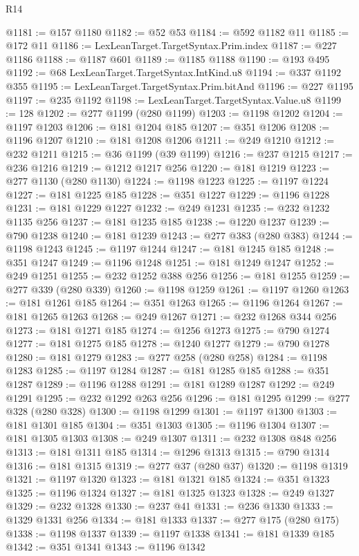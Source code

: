 \begin{lexlean}{R14}
\begin{coremodule}
@1181 := @157 @1180
@1182 := @52 @53
@1184 := @592 @1182 @11
@1185 := @172 @11
@1186 := LexLeanTarget.TargetSyntax.Prim.index
@1187 := @227 @1186
@1188 := @1187 @601
@1189 := @1185 @1188
@1190 := @193 @495
@1192 := @68 LexLeanTarget.TargetSyntax.IntKind.u8
@1194 := @337 @1192 @355
@1195 := LexLeanTarget.TargetSyntax.Prim.bitAnd
@1196 := @227 @1195
@1197 := @235 @1192
@1198 := LexLeanTarget.TargetSyntax.Value.u8
@1199 := 128
@1202 := @277 @1199 (@280 @1199)
@1203 := @1198 @1202
@1204 := @1197 @1203
@1206 := @181 @1204 @185
@1207 := @351 @1206
@1208 := @1196 @1207
@1210 := @181 @1208 @1206
@1211 := @249 @1210
@1212 := @232 @1211
@1215 := @36 @1199 (@39 @1199)
@1216 := @237 @1215
@1217 := @236 @1216
@1219 := @1212 @1217 @256
@1220 := @181 @1219
@1223 := @277 @1130 (@280 @1130)
@1224 := @1198 @1223
@1225 := @1197 @1224
@1227 := @181 @1225 @185
@1228 := @351 @1227
@1229 := @1196 @1228
@1231 := @181 @1229 @1227
@1232 := @249 @1231
@1235 := @232 @1232 @1135 @256
@1237 := @181 @1235 @185
@1238 := @1220 @1237
@1239 := @790 @1238
@1240 := @181 @1239
@1243 := @277 @383 (@280 @383)
@1244 := @1198 @1243
@1245 := @1197 @1244
@1247 := @181 @1245 @185
@1248 := @351 @1247
@1249 := @1196 @1248
@1251 := @181 @1249 @1247
@1252 := @249 @1251
@1255 := @232 @1252 @388 @256
@1256 := @181 @1255
@1259 := @277 @339 (@280 @339)
@1260 := @1198 @1259
@1261 := @1197 @1260
@1263 := @181 @1261 @185
@1264 := @351 @1263
@1265 := @1196 @1264
@1267 := @181 @1265 @1263
@1268 := @249 @1267
@1271 := @232 @1268 @344 @256
@1273 := @181 @1271 @185
@1274 := @1256 @1273
@1275 := @790 @1274
@1277 := @181 @1275 @185
@1278 := @1240 @1277
@1279 := @790 @1278
@1280 := @181 @1279
@1283 := @277 @258 (@280 @258)
@1284 := @1198 @1283
@1285 := @1197 @1284
@1287 := @181 @1285 @185
@1288 := @351 @1287
@1289 := @1196 @1288
@1291 := @181 @1289 @1287
@1292 := @249 @1291
@1295 := @232 @1292 @263 @256
@1296 := @181 @1295
@1299 := @277 @328 (@280 @328)
@1300 := @1198 @1299
@1301 := @1197 @1300
@1303 := @181 @1301 @185
@1304 := @351 @1303
@1305 := @1196 @1304
@1307 := @181 @1305 @1303
@1308 := @249 @1307
@1311 := @232 @1308 @848 @256
@1313 := @181 @1311 @185
@1314 := @1296 @1313
@1315 := @790 @1314
@1316 := @181 @1315
@1319 := @277 @37 (@280 @37)
@1320 := @1198 @1319
@1321 := @1197 @1320
@1323 := @181 @1321 @185
@1324 := @351 @1323
@1325 := @1196 @1324
@1327 := @181 @1325 @1323
@1328 := @249 @1327
@1329 := @232 @1328
@1330 := @237 @41
@1331 := @236 @1330
@1333 := @1329 @1331 @256
@1334 := @181 @1333
@1337 := @277 @175 (@280 @175)
@1338 := @1198 @1337
@1339 := @1197 @1338
@1341 := @181 @1339 @185
@1342 := @351 @1341
@1343 := @1196 @1342

\end{coremodule}
\end{lexlean}
